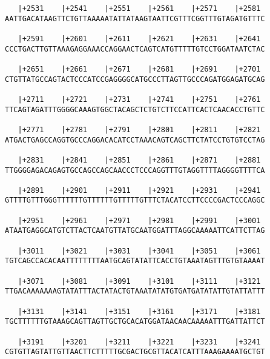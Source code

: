 \documentclass{article}
\begin{document}
\begin{Verbatim}
   |+2531    |+2541    |+2551    |+2561    |+2571    |+2581 
AATTGACATAAGTTCTGTTAAAAATATTATAAGTAATTCGTTTCGGTTTGTAGATGTTTC
                                                            
   |+2591    |+2601    |+2611    |+2621    |+2631    |+2641 
CCCTGACTTGTTAAAGAGGAAACCAGGAACTCAGTCATGTTTTTGTCCTGGATAATCTAC
                                                            
   |+2651    |+2661    |+2671    |+2681    |+2691    |+2701 
CTGTTATGCCAGTACTCCCATCCGAGGGGCATGCCCTTAGTTGCCCAGATGGAGATGCAG
                                                            
   |+2711    |+2721    |+2731    |+2741    |+2751    |+2761 
TTCAGTAGATTTGGGGCAAAGTGGCTACAGCTCTGTCTTCCATTCACTCAACACCTGTTC
                                                            
   |+2771    |+2781    |+2791    |+2801    |+2811    |+2821 
ATGACTGAGCCAGGTGCCCAGGACACATCCTAAACAGTCAGCTTCTATCCTGTGTCCTAG
                                                            
   |+2831    |+2841    |+2851    |+2861    |+2871    |+2881 
TTGGGGAGACAGAGTGCCAGCCAGCAACCCTCCCAGGTTTGTAGGTTTTAGGGGTTTTCA
                                                            
   |+2891    |+2901    |+2911    |+2921    |+2931    |+2941 
GTTTTGTTTGGGTTTTTTGTTTTTTGTTTTTGTTTCTACATCCTTCCCCGACTCCCAGGC
                                                            
   |+2951    |+2961    |+2971    |+2981    |+2991    |+3001 
ATAATGAGGCATGTCTTACTCAATGTTATGCAATGGATTTAGGCAAAAATTCATTCTTAG
                                                            
   |+3011    |+3021    |+3031    |+3041    |+3051    |+3061 
TGTCAGCCACACAATTTTTTTTAATGCAGTATATTCACCTGTAAATAGTTTGTGTAAAAT
                                                            
   |+3071    |+3081    |+3091    |+3101    |+3111    |+3121 
TTGACAAAAAAAGTATATTTACTATACTGTAAATATATGTGATGATATATTGTATTATTT
                                                            
   |+3131    |+3141    |+3151    |+3161    |+3171    |+3181 
TGCTTTTTTGTAAAGCAGTTAGTTGCTGCACATGGATAACAACAAAAATTTGATTATTCT
                                                            
   |+3191    |+3201    |+3211    |+3221    |+3231    |+3241 
CGTGTTAGTATTGTTAACTTCTTTTTGCGACTGCGTTACATCATTTAAAGAAAATGCTGT
                                                            

\end{Verbatim}
\end{document}
